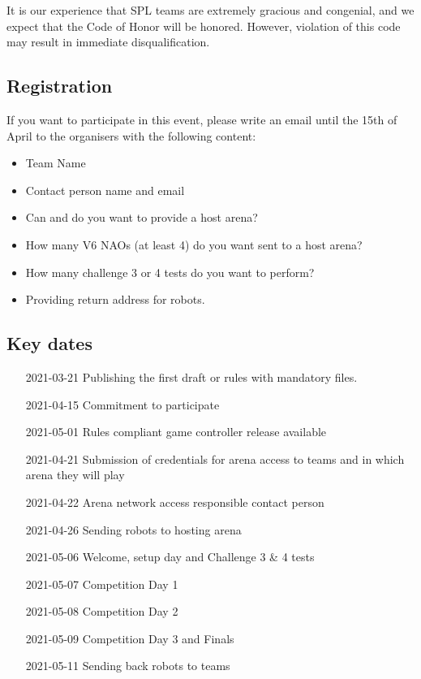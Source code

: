 It is our experience that SPL teams are extremely gracious and congenial, and we expect that the Code of Honor will be honored. However, violation of this code may result in immediate disqualification.

\subsection{Registration}

If you want to participate in this event, please write an email until the 15th of April to the organisers with the following content:
\begin{itemize}
    \item Team Name
    \item Contact person name and email
    \item Can and do you want to provide a host arena?
    \item How many V6 NAOs (at least 4) do you want sent to a host arena?
    \item How many challenge 3 or 4 tests do you want to perform?
    \item Providing return address for robots.
\end{itemize}

\subsection{Key dates}

\begin{itemize}[leftmargin=*,labelsep=0.7cm, labelindent=2cm]
    \item [2021-03-21] Publishing the first draft or rules with mandatory files.
    \item [2021-04-15] Commitment to participate
    \item [2021-05-01] Rules compliant game controller release available
    \item [2021-04-21] Submission of credentials for arena access to teams and in which arena they will play
    \item [2021-04-22] Arena network access responsible contact person
    \item [2021-04-26] Sending robots to hosting arena
    \item [2021-05-06] Welcome, setup day and Challenge 3 \& 4 tests
    \item [2021-05-07] Competition Day 1
    \item [2021-05-08] Competition Day 2
    \item [2021-05-09] Competition Day 3 and Finals
    \item [2021-05-11] Sending back robots to teams
\end{itemize}

